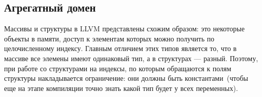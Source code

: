\subsection{Агрегатный домен}
Массивы и структуры в LLVM представлены схожим образом: это некоторые объекты 
в памяти, доступ к элементам которых можно получить по целочисленному индексу.
Главным отличием этих типов является то, что в массиве все элемены имеют 
одинаковый тип, а в структурах --- разный. Поэтому, при работе со структурами
на индексы, по которым обращаются к полям структуры накладывается ограничение:
они должны быть константами~(чтобы еще на этапе компиляции точно знать какой 
тип будет у всех переменных).


